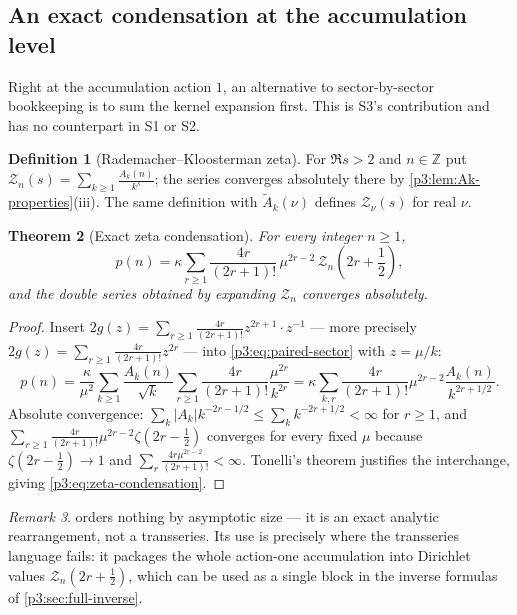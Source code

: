 \documentclass[11pt,a4paper,oneside]{book}
\theoremstyle{plain}
\newtheorem{theorem}{Theorem}[chapter]
\theoremstyle{definition}
\newtheorem{definition}[theorem]{Definition}
\theoremstyle{remark}
\newtheorem{remark}[theorem]{Remark}
\newcommand{\Int}{\mathbb{Z}}
\begin{document}
\subsection{An exact condensation at the accumulation level}

Right at the accumulation action $1$, an alternative to sector-by-sector bookkeeping is to sum the
kernel expansion first. This is S3's contribution and has no counterpart in S1 or S2.

\begin{definition}[Rademacher--Kloosterman zeta]\label{p3:def:Zeta}
For $\Re s>2$ and $n\in\Int$ put $\displaystyle
\mathcal{Z}_{n}(s)=\sum_{k\ge1}\frac{A_{k}(n)}{k^{s}}$; the series converges absolutely there by
\cref{p3:lem:Ak-properties}(iii). The same definition with $\widetilde A_{k}(\nu)$ defines
$\mathcal{Z}_{\nu}(s)$ for real $\nu$.
\end{definition}

\begin{theorem}[Exact zeta condensation]\label{p3:thm:zeta-condensation}
For every integer $n\ge1$,
\begin{equation}\label{p3:eq:zeta-condensation}
 p(n)=\kappa\sum_{r\ge1}\frac{4r}{(2r+1)!}\,\mu^{2r-2}\,
 \mathcal{Z}_{n}\!\left(2r+\frac12\right),
\end{equation}
and the double series obtained by expanding $\mathcal{Z}_{n}$ converges absolutely.
\end{theorem}

\begin{proof}
Insert $2g(z)=\sum_{r\ge1}\frac{4r}{(2r+1)!}z^{2r+1}\cdot z^{-1}$ --- more precisely
$2g(z)=\sum_{r\ge1}\frac{4r}{(2r+1)!}z^{2r}$ --- into \cref{p3:eq:paired-sector} with $z=\mu/k$:
\[
p(n)=\frac{\kappa}{\mu^{2}}\sum_{k\ge1}\frac{A_{k}(n)}{\sqrt k}
\sum_{r\ge1}\frac{4r}{(2r+1)!}\frac{\mu^{2r}}{k^{2r}}
=\kappa\sum_{k,r}\frac{4r}{(2r+1)!}\mu^{2r-2}\frac{A_{k}(n)}{k^{2r+1/2}} .
\]
Absolute convergence: $\sum_{k}|A_{k}|k^{-2r-1/2}\le\sum_{k}k^{-2r+1/2}<\infty$ for $r\ge1$, and
$\sum_{r\ge1}\frac{4r}{(2r+1)!}\mu^{2r-2}\zeta(2r-\tfrac12)$ converges for every fixed $\mu$
because $\zeta(2r-\tfrac12)\to1$ and $\sum_{r}\frac{4r\mu^{2r-2}}{(2r+1)!}<\infty$. Tonelli's
theorem justifies the interchange, giving \cref{p3:eq:zeta-condensation}.
\end{proof}

\begin{remark}
 orders nothing by asymptotic size --- it is an exact analytic
rearrangement, not a transseries. Its use is precisely where the transseries language fails: it
packages the whole action-one accumulation into Dirichlet values $\mathcal{Z}_{n}(2r+\tfrac12)$,
which can be used as a single block in the inverse formulas of \cref{p3:sec:full-inverse}.
\end{remark}
\end{document}
